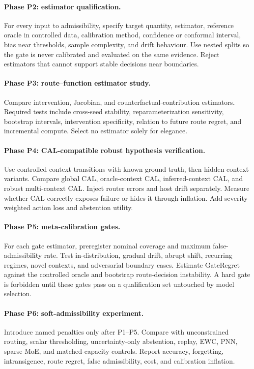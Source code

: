 \documentclass[11pt,a4paper]{article}
\begin{document}
\paragraph{Phase P2: estimator qualification.}
For every input to admissibility, specify target quantity, estimator, reference oracle in controlled data, calibration method, confidence or conformal interval, bias near thresholds, sample complexity, and drift behaviour. Use nested splits so the gate is never calibrated and evaluated on the same evidence. Reject estimators that cannot support stable decisions near boundaries.

\paragraph{Phase P3: route--function estimator study.}
Compare intervention, Jacobian, and counterfactual-contribution estimators. Required tests include cross-seed stability, reparameterization sensitivity, bootstrap intervals, intervention specificity, relation to future route regret, and incremental compute. Select no estimator solely for elegance.

\paragraph{Phase P4: CAL-compatible robust hypothesis verification.}
Use controlled context transitions with known ground truth, then hidden-context variants. Compare global CAL, oracle-context CAL, inferred-context CAL, and robust multi-context CAL. Inject router errors and host drift separately. Measure whether CAL correctly exposes failure or hides it through inflation. Add severity-weighted action loss and abstention utility.

\paragraph{Phase P5: meta-calibration gates.}
For each gate estimator, preregister nominal coverage and maximum false-admissibility rate. Test in-distribution, gradual drift, abrupt shift, recurring regimes, novel contexts, and adversarial boundary cases. Estimate GateRegret against the controlled oracle and bootstrap route-decision instability. A hard gate is forbidden until these gates pass on a qualification set untouched by model selection.

\paragraph{Phase P6: soft-admissibility experiment.}
Introduce named penalties only after P1--P5. Compare with unconstrained routing, scalar thresholding, uncertainty-only abstention, replay, EWC, PNN, sparse MoE, and matched-capacity controls. Report accuracy, forgetting, intransigence, route regret, false admissibility, cost, and calibration inflation.
\end{document}
